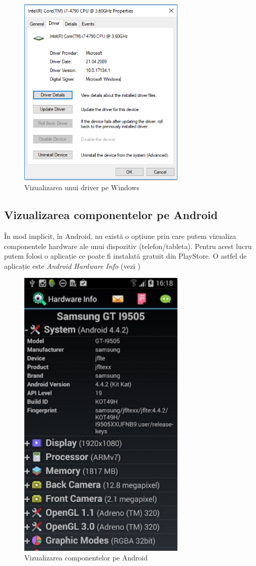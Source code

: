 \begin{figure}[!htbp]
	\centering
	\includegraphics[width=8cm]{chapters/08-hw/img/driver-virt-img.png}
	\caption{Vizualizarea unui driver pe Windows}
	\label{fig:hw-driver-virt}
\end{figure}

\subsection{Vizualizarea componentelor pe Android}
\label{sec:hardware-virtualizare-android}

În mod implicit, în Android, nu există o opțiune prin care putem vizualiza
componentele hardware ale unui dispozitiv (telefon/tableta). Pentru acest lucru
putem folosi o aplicație ce poate fi instalată gratuit din PlayStore. O astfel
de aplicație este \textit{Android Hardware Info} (vezi
)

\begin{figure}[!htbp]
	\centering
	\includegraphics[width=8cm]{chapters/08-hw/img/android-img.png}
	\caption{Vizualizarea componentelor pe Android}
	\label{fig:hw-android}
\end{figure}
